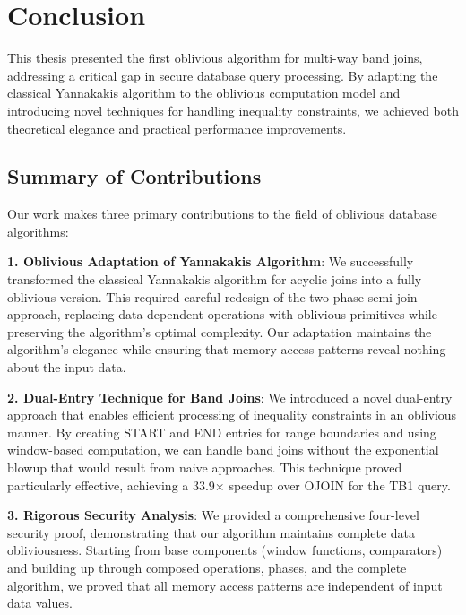 \chapter{Conclusion}

This thesis presented the first oblivious algorithm for multi-way band joins, addressing a critical gap in secure database query processing. By adapting the classical Yannakakis algorithm to the oblivious computation model and introducing novel techniques for handling inequality constraints, we achieved both theoretical elegance and practical performance improvements.

\section{Summary of Contributions}

Our work makes three primary contributions to the field of oblivious database algorithms:

\textbf{1. Oblivious Adaptation of Yannakakis Algorithm}: We successfully transformed the classical Yannakakis algorithm for acyclic joins into a fully oblivious version. This required careful redesign of the two-phase semi-join approach, replacing data-dependent operations with oblivious primitives while preserving the algorithm's optimal complexity. Our adaptation maintains the algorithm's elegance while ensuring that memory access patterns reveal nothing about the input data.

\textbf{2. Dual-Entry Technique for Band Joins}: We introduced a novel dual-entry approach that enables efficient processing of inequality constraints in an oblivious manner. By creating START and END entries for range boundaries and using window-based computation, we can handle band joins without the exponential blowup that would result from naive approaches. This technique proved particularly effective, achieving a 33.9× speedup over OJOIN for the TB1 query.

\textbf{3. Rigorous Security Analysis}: We provided a comprehensive four-level security proof, demonstrating that our algorithm maintains complete data obliviousness. Starting from base components (window functions, comparators) and building up through composed operations, phases, and the complete algorithm, we proved that all memory access patterns are independent of input data values.


